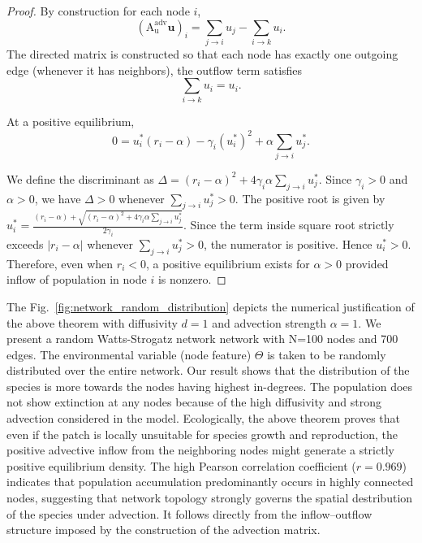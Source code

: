 \documentclass[12pt]{article}
\begin{document}
\begin{proof}
By construction for each node $i$,
\begin{equation}
    (\mathrm{A_u^{\mathrm{adv}}} \mathbf{u})_i
=
\sum_{j\to i} u_j
-
\sum_{i\to k} u_i.
\end{equation}
The directed matrix is constructed so that
each node has exactly one outgoing edge (whenever it has neighbors),
the outflow term satisfies
\[
\sum_{i\to k} u_i = u_i.
\]

At a positive equilibrium,
\[
0
=
u_i^*(r_i - \alpha)
-
\gamma_i (u_i^*)^2
+
\alpha \sum_{j\to i} u_j^*.
\]

We define the discriminant as 
$\Delta
=
(r_i - \alpha)^2
+
4\gamma_i \alpha \sum_{j\to i} u_j^*.$
Since $\gamma_i>0$ and $\alpha>0$, we have $\Delta>0$
whenever $\sum_{j\to i} u_j^*>0$. The positive root is given by
$u_i^*
=
\frac{
(r_i - \alpha)
+
\sqrt{(r_i - \alpha)^2
+
4\gamma_i \alpha \sum_{j\to i} u_j^*}
}
{2\gamma_i}.$
Since the term inside square root strictly exceeds $|r_i-\alpha|$
whenever $\sum_{j\to i} u_j^*>0$, the numerator is positive.
Hence $u_i^*>0$. Therefore, even when $r_i<0$, a positive equilibrium
exists for $\alpha>0$ provided inflow of population in node $i$ is nonzero.
\end{proof}

The Fig.~\ref{fig:network_random_distribution} depicts the numerical justification of the above theorem with diffusivity $d=1$ and advection strength $\alpha=1$. We present a random Watts-Strogatz network \cite{watts1998collective} network with N=100 nodes and 700 edges. The environmental variable (node feature) $\Theta$ is taken to be randomly distributed over the entire network. Our result shows that the distribution of the species is more towards the nodes having highest in-degrees. The population does not show extinction at any nodes because of the high diffusivity and strong advection considered in the model. Ecologically, the above theorem proves that even if the patch is locally unsuitable for species growth and reproduction, the
positive advective inflow from the neighboring nodes might generate a strictly positive equilibrium density. The high Pearson correlation coefficient ($r=0.969$) indicates that population accumulation predominantly occurs in highly connected nodes, suggesting that network topology strongly governs the spatial destribution of the species under advection. It follows directly from the inflow–outflow structure imposed by the construction of the advection matrix.
\end{document}
